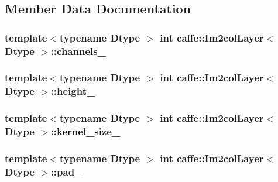 \subsection{Member Data Documentation}
\hypertarget{classcaffe_1_1_im2col_layer_a819581a35ffba22f5df2c0340210c2e9}{
\subsubsection[{channels\+\_\+}]{\setlength{\rightskip}{0pt plus 5cm}template$<$typename Dtype $>$ int {\bf caffe\+::\+Im2col\+Layer}$<$ Dtype $>$\+::channels\+\_\+\hspace{0.3cm}{\ttfamily [protected]}}}\label{classcaffe_1_1_im2col_layer_a819581a35ffba22f5df2c0340210c2e9}
\hypertarget{classcaffe_1_1_im2col_layer_ade34e2397b55eb5687a32c9e59137ca9}{
\subsubsection[{height\+\_\+}]{\setlength{\rightskip}{0pt plus 5cm}template$<$typename Dtype $>$ int {\bf caffe\+::\+Im2col\+Layer}$<$ Dtype $>$\+::height\+\_\+\hspace{0.3cm}{\ttfamily [protected]}}}\label{classcaffe_1_1_im2col_layer_ade34e2397b55eb5687a32c9e59137ca9}
\hypertarget{classcaffe_1_1_im2col_layer_af4cb2dc9a9691d840dc5b18ddca5f3f3}{
\subsubsection[{kernel\+\_\+size\+\_\+}]{\setlength{\rightskip}{0pt plus 5cm}template$<$typename Dtype $>$ int {\bf caffe\+::\+Im2col\+Layer}$<$ Dtype $>$\+::kernel\+\_\+size\+\_\+\hspace{0.3cm}{\ttfamily [protected]}}}\label{classcaffe_1_1_im2col_layer_af4cb2dc9a9691d840dc5b18ddca5f3f3}
\hypertarget{classcaffe_1_1_im2col_layer_a37ed956e35a1b04a3c0da7363aa9ea1f}{
\subsubsection[{pad\+\_\+}]{\setlength{\rightskip}{0pt plus 5cm}template$<$typename Dtype $>$ int {\bf caffe\+::\+Im2col\+Layer}$<$ Dtype $>$\+::pad\+\_\+\hspace{0.3cm}{\ttfamily [protected]}}}\label{classcaffe_1_1_im2col_layer_a37ed956e35a1b04a3c0da7363aa9ea1f}
